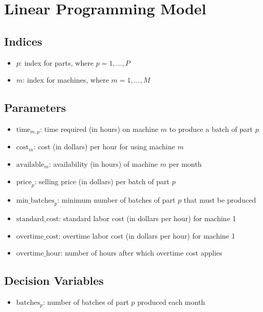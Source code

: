 \documentclass{article}
\begin{document}
\section*{Linear Programming Model}

\subsection*{Indices}
\begin{itemize}
    \item \( p \): index for parts, where \( p = 1, \ldots, P \)
    \item \( m \): index for machines, where \( m = 1, \ldots, M \)
\end{itemize}

\subsection*{Parameters}
\begin{itemize}
    \item \( \text{time}_{m,p} \): time required (in hours) on machine \( m \) to produce a batch of part \( p \)
    \item \( \text{cost}_{m} \): cost (in dollars) per hour for using machine \( m \)
    \item \( \text{available}_{m} \): availability (in hours) of machine \( m \) per month
    \item \( \text{price}_{p} \): selling price (in dollars) per batch of part \( p \)
    \item \( \text{min\_batches}_{p} \): minimum number of batches of part \( p \) that must be produced
    \item \( \text{standard\_cost} \): standard labor cost (in dollars per hour) for machine 1
    \item \( \text{overtime\_cost} \): overtime labor cost (in dollars per hour) for machine 1
    \item \( \text{overtime\_hour} \): number of hours after which overtime cost applies
\end{itemize}

\subsection*{Decision Variables}
\begin{itemize}
    \item \( \text{batches}_{p} \): number of batches of part \( p \) produced each month
\end{itemize}
\end{document}

